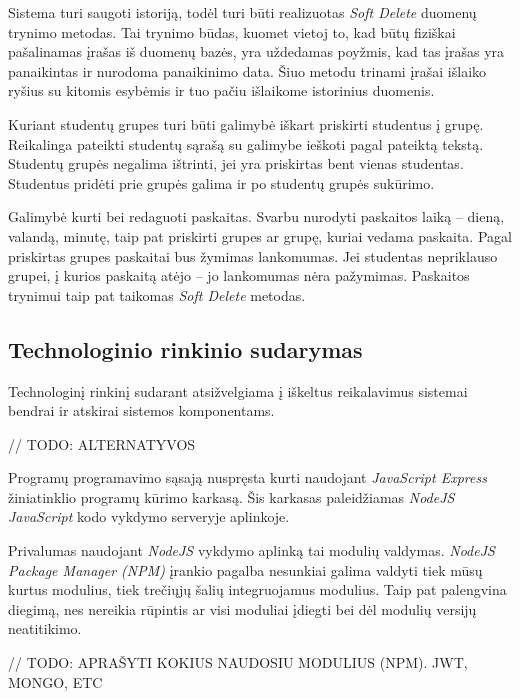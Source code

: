 \documentclass{VUMIFPSkursinis}
\begin{document}
Sistema turi saugoti istoriją, todėl turi būti realizuotas \textit{Soft Delete} duomenų trynimo metodas. Tai trynimo būdas, kuomet vietoj to, kad būtų fiziškai pašalinamas įrašas iš duomenų bazės, yra uždedamas poyžmis, kad tas įrašas yra panaikintas ir nurodoma panaikinimo data. Šiuo metodu trinami įrašai išlaiko ryšius su kitomis esybėmis ir tuo pačiu išlaikome istorinius duomenis.


Kuriant studentų grupes turi būti galimybė iškart priskirti studentus į grupę. Reikalinga pateikti studentų sąrašą su galimybe ieškoti pagal pateiktą tekstą. Studentų grupės negalima ištrinti, jei yra priskirtas bent vienas studentas. Studentus pridėti prie grupės galima ir po studentų grupės sukūrimo.


Galimybė kurti bei redaguoti paskaitas. Svarbu nurodyti paskaitos laiką – dieną, valandą, minutę, taip pat priskirti grupes ar grupę, kuriai vedama paskaita. Pagal priskirtas grupes paskaitai bus žymimas lankomumas. Jei studentas nepriklauso grupei, į kurios paskaitą atėjo – jo lankomumas nėra pažymimas. Paskaitos trynimui taip pat taikomas \textit{Soft Delete} metodas.

\subsection{Technologinio rinkinio sudarymas}

Technologinį rinkinį sudarant atsižvelgiama į iškeltus reikalavimus sistemai bendrai ir atskirai sistemos komponentams.

// TODO: ALTERNATYVOS

Programų programavimo sąsają nuspręsta kurti naudojant \textit{JavaScript Express} žiniatinklio programų kūrimo karkasą. Šis karkasas paleidžiamas \textit{NodeJS} \textit{JavaScript} kodo vykdymo serveryje aplinkoje.

Privalumas naudojant \textit{NodeJS} vykdymo aplinką tai modulių valdymas. \textit{NodeJS Package Manager (NPM)} įrankio pagalba nesunkiai galima valdyti tiek mūsų kurtus modulius, tiek trečiųjų šalių integruojamus modulius. Taip pat palengvina diegimą, nes nereikia rūpintis ar visi moduliai įdiegti bei dėl modulių versijų neatitikimo.

// TODO: APRAŠYTI KOKIUS NAUDOSIU MODULIUS (NPM). JWT, MONGO, ETC
\end{document}

